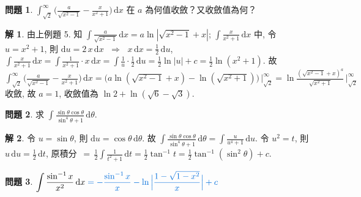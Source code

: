 \documentclass[12pt]{extarticle}
\newcommand{\ds}{\displaystyle}
\newcommand{\ie}{\;\Longrightarrow\;}
\theoremstyle{definition}
\newtheorem*{ex}{問題}
\newtheorem*{sol}{解}
\newcommand{\myline}{\noindent\makebox[\linewidth]{\rule{\paperwidth}{0.4pt}}}
\begin{document}
\begin{ex}
  $\ds\int_{\sqrt{2}}^{\infty}\Big(\frac{a}{\sqrt{x^2 - 1}} - \frac{x}{x^2 + 1}\Big)\,\text{d}x$ 在 $a$ 為何值收斂？又收斂值為何？
\end{ex}

\begin{sol}
  由上例題 5. 知 $\ds\int\!\frac{a}{\sqrt{x^2 - 1}}\,\text{d}x = a \ln|\sqrt{x^2 - 1} + x|$; $\ds\int\!\frac{x}{x^2+1}\,\text{d}x$ 中, 令 $\ds u = x^2 + 1$, 則 $\ds\text{d}u = 2\,x\,\text{d}x$ $\ie$ $\ds x\,\text{d}x=\frac{1}{2}\,\text{d}u$, $\ds\int\!\frac{x}{x^2+1}\,\text{d}x = \int\!\frac{1}{x^2+1}\cdot x\,\text{d}x = \int\!\frac{1}{u}\cdot\frac{1}{2}\,\text{d}u = \frac{1}{2}\ln|u| + c = \frac{1}{2}\ln(x^2 + 1)$. 故 $\ds\int_{\sqrt{2}}^{\infty}\Big(\frac{a}{\sqrt{x^2 - 1}} - \frac{x}{x^2 + 1}\Big)\,\text{d}x = \Big(a \ln(\sqrt{x^2 - 1} + x) - \ln(\sqrt{x^2 + 1})\Big)\,\Big|_{\sqrt{2}}^{\infty} = \ln\frac{(\sqrt{x^2 - 1} + x)^a}{\sqrt{x^2 + 1}}\,\Big|_{\sqrt{2}}^{\infty}$ 收斂, 故 $a = 1$, 收斂值為 $\ln 2 + \ln(\sqrt{6} - \sqrt{3})$.  
\end{sol}

\myline

\begin{ex}
  求 $\ds\int\!\frac{\sin\theta\cos\theta}{\sin^4\theta+1}\,\text{d}\theta$. 
\end{ex}

\begin{sol}
  令 $\ds u = \sin\theta$, 則 $\ds\text{d}u = \cos\theta\,\text{d}\theta$. 故 $\ds\int\!\frac{\sin\theta\cos\theta}{\sin^4\theta+1}\,\text{d}\theta = \int\!\frac{u}{u^4+1}\,\text{d}u$. 令 $\ds u^2 = t$, 則 $\ds u\,\text{d}u = \frac{1}{2}\,\text{d}t$, 原積分 $\ds\,=\,\frac{1}{2}\int\frac{1}{t^2 + 1}\,\text{d}t = \frac{1}{2}\tan^{-1}t = \frac{1}{2}\tan^{-1}(\sin^2\theta) + c$. 
\end{sol}

\begin{ex} 
  $\ds\int\frac{\sin^{-1}x}{x^2}\,\text{d}x {\color{C2}\;= - \frac{\sin^{-1}x}{x} - \ln\Big|\frac{1 - \sqrt{1 - x^2}}{x}\Big| + c}$
\end{ex}
\end{document}
